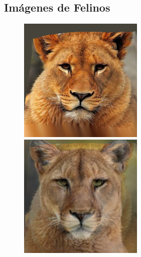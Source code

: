 \documentclass[conference]{IEEEtran}
\begin{document}
	\subsection*{Imágenes de Felinos}
\begin{figure}[H]
\begin{multicols}{3}
    \centering
    \includegraphics[width=1.0\linewidth]{TestsCats/G/img01.png} \par
    \includegraphics[width=1.0\linewidth]{TestsCats/G/img30.png} \par
    

\end{multicols}
\end{figure}
\end{document}
